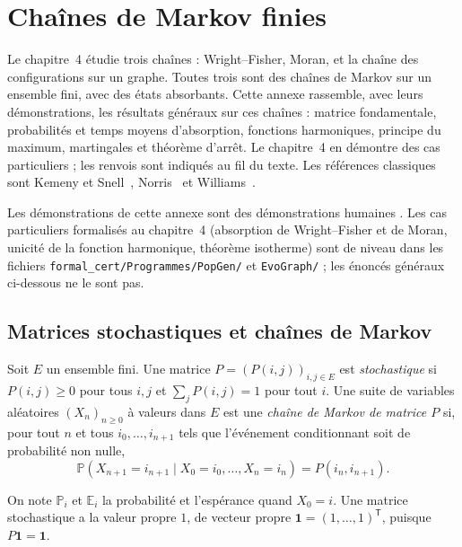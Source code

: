 \chapter{Chaînes de Markov finies}\label{appB:chap}

Le chapitre~4 étudie trois chaînes : Wright--Fisher, Moran, et la chaîne des configurations sur un graphe. Toutes trois
sont des chaînes de Markov sur un ensemble fini, avec des états absorbants. Cette annexe rassemble, avec leurs
démonstrations, les résultats généraux sur ces chaînes : matrice fondamentale, probabilités et temps moyens
d'absorption, fonctions harmoniques, principe du maximum, martingales et théorème d'arrêt. Le chapitre~4 en démontre des
cas particuliers ; les renvois sont indiqués au fil du texte. Les références classiques sont Kemeny et
Snell~\cite{ch4:KS}, Norris~\cite{app:norris} et Williams~\cite{app:williams}.

\begin{warnbox}[: niveaux]
Les démonstrations de cette annexe sont des démonstrations humaines \tierC. Les cas particuliers formalisés au
chapitre~4 (absorption de Wright--Fisher et de Moran, unicité de la fonction harmonique, théorème isotherme) sont de
niveau \tierA{} dans les fichiers \texttt{formal\_cert/Programmes/PopGen/} et \texttt{EvoGraph/} ; les énoncés généraux
ci-dessous ne le sont pas.
\end{warnbox}

\section{Matrices stochastiques et chaînes de Markov}\label{appB:sec:def}

\begin{definition}
Soit $E$ un ensemble fini. Une matrice $P=(P(i,j))_{i,j\in E}$ est \emph{stochastique} si $P(i,j)\ge0$ pour tous $i,j$
et $\sum_jP(i,j)=1$ pour tout $i$. Une suite de variables aléatoires $(X_n)_{n\ge0}$ à valeurs dans $E$ est une
\emph{chaîne de Markov de matrice $P$} si, pour tout $n$ et tous $i_0,\dots,i_{n+1}$ tels que l'événement conditionnant
soit de probabilité non nulle,
\[\mathbb P(X_{n+1}=i_{n+1}\mid X_0=i_0,\dots,X_n=i_n)=P(i_n,i_{n+1}) .\]
\end{definition}
On note $\mathbb P_i$ et $\mathbb E_i$ la probabilité et l'espérance quand $X_0=i$. Une matrice stochastique a la valeur
propre $1$, de vecteur propre $\mathbf 1=(1,\dots,1)^{\mathsf T}$, puisque $P\mathbf 1=\mathbf 1$.


